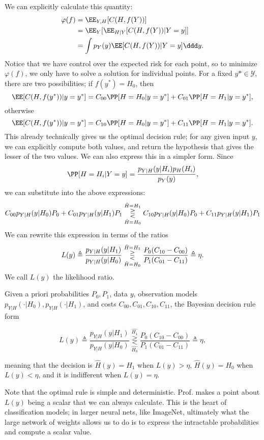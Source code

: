 We can explicitly calculate this quantity: 
\begin{align*}
	\varphi(f) &= \EE_{Y,H}[C(H, f(Y))] \\
						 &= \EE_{Y}[\EE_{H|Y}[C(H, f(Y)) | Y=y]] \\
						 &= \int p_Y(y) \EE[C(H, f(Y)) | Y=y] \ddd y.
\end{align*}
Notice that we have control over the expected risk for each point, so to minimize $\varphi(f)$, we only have to solve a solution for individual points. For a fixed $y*\in \mathcal{Y}$, there are two possibilities; if $f(y^*) = H_0$, then 
\[\EE[C(H,f(y^*)) | y=y^*] = C_{00}\PP[H=H_0 | y=y^*] + C_{01}\PP[H=H_1 | y=y^*],\] 
otherwise
\[\EE[C(H, f(y^*)) | y=y^*] = C_{10}\PP[H=H_0 | y=y^*] + C_{11}\PP[H=H_1 | y=y^*].\]
This already technically gives us the optimal decision rule; for any given input $y$, we can explicitly compute both values, and return the hypothesis that gives the lesser of the two values. We can also express this in a simpler form. Since
\[\PP[H=H_i | Y=y] = \frac{p_{Y|H}(y|H_i)p_{H}(H_i)}{p_Y(y)},\]
we can substitute into the above expressions: 
\[C_{00}p_{Y|H}(y|H_0)P_0 + C_{01}p_{Y|H}(y|H_1)P_1 \overunderset{\hat{H}=H_1}{\hat{H}=H_0}{\gtreqless} C_{10}p_{Y|H}(y|H_0)P_0 + C_{11}p_{Y|H}(y|H_1)P_1\] 
We can rewrite this expression in terms of the ratios 
\[L(y) \triangleq \frac{p_{Y|H}(y|H_1)}{p_{Y|H}(y|H_0)} \overunderset{\hat{H}=H_1}{\hat{H}=H_0}{\gtreqless} \frac{P_0(C_{10}-C_{00})}{P_1(C_{01}-C_{11})} \triangleq \eta.\] 
We call $L(y)$ the \ac{likelihood ratio}. 

\begin{theorem}

Given a priori probabilities $P_0,P_1$, data $y$, observation models $p_{Y|H}(\cdot|H_0), p_{Y|H}(\cdot|H_1)$, and costs $C_{00}, C_{01}, C_{10}, C_{11}$, the Bayesian decision rule form 

\[L(y) \triangleq \frac{p_{Y|H}(y|H_1)}{p_{Y|H}(y|H_0)} \underset{\hat{H_0}}{\overset{\hat{H_1}}{\gtreqless}} \frac{P_0(C_{10}-C_{00})}{P_1(C_{01}-C_{11})} \triangleq \eta,\] 

meaning that the decision is $\hat{H}(y) = H_1$ when $L(y) > \eta$, $\hat{H}(y) = H_0$ when $L(y) < \eta$, and it is indifferent when $L(y)=\eta$. 
\end{theorem}

Note that the optimal rule is simple and deterministic. Prof. makes a point about $L(y)$ being a scalar that we can always calculate. This is the heart of classification models; in larger neural nets, like ImageNet, ultimately what the large network of weights allows us to do is to express the intractable probabilities and compute a scalar value. 

